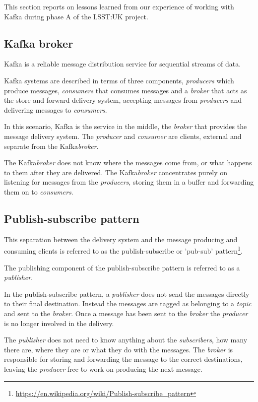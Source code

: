 \documentclass{article}
\newcommand{\kafka} {Kafka\xspace}
\newcommand{\kftopic} {\textit{topic}\xspace}
\newcommand{\kfbroker} {\textit{broker}\xspace}
\newcommand{\kfconsumer} {\textit{consumer}\xspace}
\newcommand{\kfconsumers} {\textit{consumers}\xspace}
\newcommand{\kfproducer} {\textit{producer}\xspace}
\newcommand{\kfproducers} {\textit{producers}\xspace}
\newcommand{\kfpublisher} {\textit{publisher}\xspace}
\newcommand{\kfsubscribers} {\textit{subscribers}\xspace}
\newcommand{\phasea} {phase A\xspace}
\newcommand{\lsstuk} {LSST:UK\xspace}
\newcommand{\footurl}[1] {\footnote{\url{#1}}}
\begin{document}
This section reports on lessons learned from our experience of working with \kafka during \phasea of the \lsstuk project.

\subsection{Kafka broker}
\label{kafka-broker}

\kafka is a reliable message distribution service for sequential streams of data.

\kafka systems are described in terms of three components, \kfproducers which produce messages, \kfconsumers that consumes messages and a \kfbroker that acts as the store and forward delivery system, accepting messages from \kfproducers and delivering messages to \kfconsumers.

In this scenario, \kafka is the service in the middle, the \kfbroker that provides the message delivery system. The \kfproducer and \kfconsumer are clients, external and separate from the \kafka \kfbroker.

The \kafka \kfbroker does not know where the messages come from, or what happens to them after they are delivered.
The \kafka \kfbroker concentrates purely on listening for messages from the \kfproducers, storing them in a buffer and forwarding them on to \kfconsumers.

\subsection{Publish-subscribe pattern}
\label{kafka-pubsub-pattern}

This separation between the delivery system and the message producing and consuming clients is referred to as the publish-subscribe or 'pub-sub' pattern\footurl{https://en.wikipedia.org/wiki/Publish-subscribe_pattern}.

The publishing component of the publish-subscribe pattern is referred to as a \kfpublisher.

In the publish-subscribe pattern, a \kfpublisher does not send the messages directly to their final destination. Instead the messages are tagged as belonging to a \kftopic and sent to the \kfbroker.
Once a message has been sent to the \kfbroker the \kfproducer is no longer involved in the delivery.

The \kfpublisher does not need to know anything about the \kfsubscribers, how many there are, where they are or what they do with the messages.
The \kfbroker is responsible for storing and forwarding the message to the correct destinations, leaving the \kfproducer free to work on producing the next message.
\end{document}
